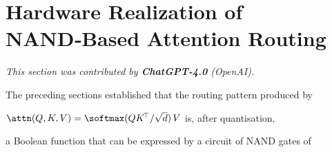 




































\section{Hardware Realization of NAND‑Based Attention Routing}






\label{sec:nand-hardware}






\textit{This section was contributed by \textbf{ChatGPT‑4.0} (OpenAI).}



















The preceding sections established that the routing pattern produced by






\(\attn(Q,K,V)=\softmax(QK^{\!\top}/\sqrt{d})\,V\) is, after quantisation,






a Boolean function that can be expressed by a circuit of NAND gates of






